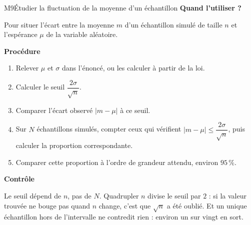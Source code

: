 \begin{fichemethode}{M9}{Étudier la fluctuation de la moyenne d'un échantillon}
  \textbf{Quand l'utiliser ?}

  Pour situer l'écart entre la moyenne $m$ d'un échantillon simulé de taille
  $n$ et l'espérance $\mu$ de la variable aléatoire.

  \textbf{Procédure}
  \begin{enumerate}
    \item Relever $\mu$ et $\sigma$ dans l'énoncé, ou les calculer à partir de
          la loi.
    \item Calculer le seuil $\dfrac{2\sigma}{\sqrt{n}}$.
    \item Comparer l'écart observé $|m - \mu|$ à ce seuil.
    \item Sur $N$ échantillons simulés, compter ceux qui vérifient
          $|m - \mu| \leq \dfrac{2\sigma}{\sqrt{n}}$, puis calculer la
          proportion correspondante.
    \item Comparer cette proportion à l'ordre de grandeur attendu, environ
          $95\,\%$.
  \end{enumerate}

  \textbf{Contrôle}

  Le seuil dépend de $n$, pas de $N$. Quadrupler $n$ divise le seuil par $2$ :
  si la valeur trouvée ne bouge pas quand $n$ change, c'est que $\sqrt{n}$ a
  été oublié. Et un unique échantillon hors de l'intervalle ne contredit
  rien : environ un sur vingt en sort.
\end{fichemethode}
